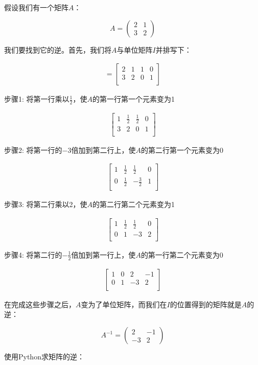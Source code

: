 \begin{exercise}
假设我们有一个矩阵\(A\)：

\[A = \begin{pmatrix} 2 & 1 \\ 3 & 2 \end{pmatrix}\]

我们要找到它的逆。首先，我们将\(A\)与单位矩阵\(I\)并排写下：

\begin{align*}
[A|I] = \left[\begin{array}{cc|cc}
2 & 1 & 1 & 0 \\
3 & 2 & 0 & 1 \\
\end{array}\right]
\end{align*}

步骤1: 将第一行乘以\(\frac{1}{2}\)，使\(A\)的第一行第一个元素变为1

\begin{align*}
\left[\begin{array}{cc|cc}
1 & \frac{1}{2} & \frac{1}{2} & 0 \\
3 & 2 & 0 & 1 \\
\end{array}\right]
\end{align*}

步骤2: 将第一行的\(-3\)倍加到第二行上，使\(A\)的第二行第一个元素变为0

\begin{align*}
\left[\begin{array}{cc|cc}
1 & \frac{1}{2} & \frac{1}{2} & 0 \\
0 & \frac{1}{2} & -\frac{3}{2} & 1 \\
\end{array}\right]
\end{align*}

步骤3: 将第二行乘以2，使\(A\)的第二行第二个元素变为1

\begin{align*}
\left[\begin{array}{cc|cc}
1 & \frac{1}{2} & \frac{1}{2} & 0 \\
0 & 1 & -3 & 2 \\
\end{array}\right]
\end{align*}

步骤4: 将第二行的\(-\frac{1}{2}\)倍加到第一行上，使\(A\)的第一行第二个元素变为0

\begin{align*}
\left[\begin{array}{cc|cc}
1 & 0 & 2 & -1 \\
0 & 1 & -3 & 2 \\
\end{array}\right]
\end{align*}

在完成这些步骤之后，\(A\)变为了单位矩阵，而我们在\(I\)的位置得到的矩阵就是\(A\)的逆：

\[A^{-1} = \begin{pmatrix} 2 & -1 \\ -3 & 2 \end{pmatrix}\]

\end{exercise}

使用Python求矩阵的逆：




